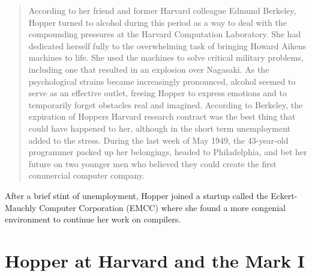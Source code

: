 \begin{quotation}
    According to her friend and former Harvard colleague Edmund Berkeley, Hopper turned to
    alcohol during this period as a way to deal with the compounding pressures at the 
    Harvard Computation Laboratory. She had dedicated herself fully to the overwhelming task of
    bringing Howard Aikens machines to life.
    She used the machines to solve critical military problems, 
    including one that resulted in an explosion over Nagasaki. 
    As the psychological strains became increasingly pronounced, 
    alcohol seemed to serve as an effective outlet, 
    freeing Hopper to express emotions and to temporarily forget obstacles real and imagined. 
    According to Berkeley, the expiration of Hoppers Harvard research contract was the best thing 
    that could have happened to her, although in the short term unemployment added to the stress. 
    During the last week of May 1949, the 43-year-old programmer packed up her belongings, 
    headed to Philadelphia, and bet her future on two younger men who believed they could create 
    the first commercial computer company.\cite{grace_hopper_and_the_invention_of_the_information_age_2009}
\end{quotation}

After a brief stint of unemployment, Hopper joined a startup called the Eckert-Mauchly Computer Corporation (EMCC)
where she found a more congenial environment to continue her work on compilers.

\section{Hopper at Harvard and the Mark I}


